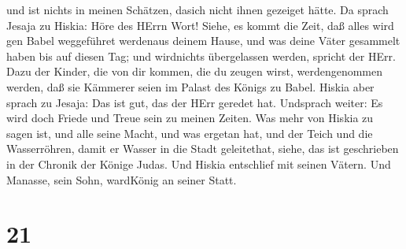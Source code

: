 und ist nichts in meinen Schätzen, dasich nicht ihnen gezeiget hätte.
 Da sprach Jesaja zu Hiskia: Höre des HErrn Wort!
 Siehe, es kommt die Zeit, daß alles wird gen Babel
weggeführet werdenaus deinem Hause, und was deine Väter gesammelt haben
bis auf diesen Tag; und wirdnichts übergelassen werden, spricht der
HErr.  Dazu der Kinder, die von dir kommen, die du zeugen
wirst, werdengenommen werden, daß sie Kämmerer seien im Palast des
Königs zu Babel.  Hiskia aber sprach zu Jesaja: Das ist
gut, das der HErr geredet hat. Undsprach weiter: Es wird doch Friede und
Treue sein zu meinen Zeiten.  Was mehr von Hiskia zu sagen
ist, und alle seine Macht, und was ergetan hat, und der Teich und die
Wasserröhren, damit er Wasser in die Stadt geleitethat, siehe, das ist
geschrieben in der Chronik der Könige Judas.  Und Hiskia
entschlief mit seinen Vätern. Und Manasse, sein Sohn, wardKönig an
seiner Statt.

\hypertarget{section-20}{%
\section{21}\label{section-20}}

